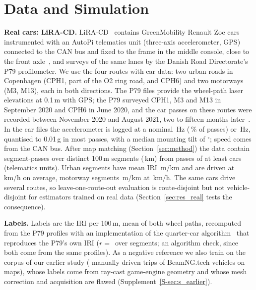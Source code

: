 \section{Data and Simulation}
\label{sec:data}

\textbf{Real cars: LiRA-CD.}
LiRA-CD~\cite{skar2023lira,lira_data} contains GreenMobility Renault Zoe cars instrumented with an AutoPi telematics unit (three-axis accelerometer, GPS) connected to the CAN bus and fixed to the frame in the middle console, close to the front axle~\cite{skar2023lira}, and surveys of the same lanes by the Danish Road Directorate's P79 profilometer.
We use the four routes with car data: two urban roads in Copenhagen (CPH1, part of the O2 ring road, and CPH6) and two motorways (M3, M13), each in both directions.
The P79 files provide the wheel-path laser elevations at 0.1\,m with GPS; the P79 surveyed CPH1, M3 and M13 in September 2020 and CPH6 in June 2020, and the car passes on these routes were recorded between November 2020 and August 2021, two to fifteen months later~\cite{lira_data}.
In the car files the accelerometer is logged at a nominal \liraRateLow\,Hz (\liraRateLowShare\,\% of passes) or \liraRateHigh\,Hz, quantised to 0.01\,g in most passes, with a median mounting tilt of \liraTiltMedian$^\circ$; speed comes from the CAN bus.
After map matching (Section~\ref{sec:method}) the data contain \liraUnits{} segment-passes over \liraSegments{} distinct 100\,m segments (\liraKm\,km) from \liraPasses{} passes of at least \liraDevices{} cars (telematics units).
Urban segments have mean IRI \liraIriUrban\,m/km and are driven at \liraSpeedUrban\,km/h on average, motorway segments \liraIriMotorway\,m/km at \liraSpeedMotorway\,km/h.
The same cars drive several routes, so leave-one-route-out evaluation is route-disjoint but not vehicle-disjoint for estimators trained on real data (Section~\ref{sec:res_real} tests the consequence).

\textbf{Labels.}
Labels are the IRI per 100\,m, mean of both wheel paths, recomputed from the P79 profiles with an implementation of the quarter-car algorithm~\cite{sayers1995iri,astm_e1926} that reproduces the P79's own IRI ($r=$\,\iriValR{} over \iriValN{} segments; an algorithm check, since both come from the same profiles).
As a negative reference we also train on the corpus of our earlier study (\bngTrips{} manually driven trips of \bngCars{} BeamNG.tech vehicles on \bngMaps{} maps), whose labels come from ray-cast game-engine geometry and whose mesh correction and acquisition are flawed (Supplement~\ref{S-sec:s_earlier}).

